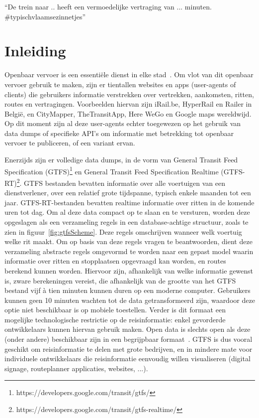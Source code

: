 \begin{savequote}[0.55\linewidth]
	``De trein naar .. heeft een vermoedelijke vertraging van ... minuten. \#typischvlaamsezinnetjes''
\end{savequote}

\chapter{Inleiding}
\label{chap:intro}
Openbaar vervoer is een essentiële dienst in elke stad~\citep{programmableweb14}. Om vlot van dit openbaar vervoer gebruik te maken, zijn er tientallen websites en apps (user-agents of clients) die gebruikers informatie verstrekken over vertrekken, aankomsten, ritten, routes en vertragingen. Voorbeelden hiervan zijn iRail.be, HyperRail en Railer in België, en CityMapper, TheTransitApp, Here WeGo en Google maps wereldwijd. Op dit moment zijn al deze user-agents echter toegewezen op het gebruik van data dumps of specifieke API's om informatie met betrekking tot openbaar vervoer te publiceren, of een variant ervan. 

Enerzijds zijn er volledige data dumps, in de vorm van General Transit Feed Specification (GTFS)\footnote{https://developers.google.com/transit/gtfs/} en General Transit Feed Specification Realtime (GTFS-RT)\footnote{https://developers.google.com/transit/gtfs-realtime/}. GTFS bestanden bevatten informatie over alle voertuigen van een dienstverlener, over een relatief grote tijdspanne, typisch enkele maanden tot een jaar. GTFS-RT-bestanden bevatten realtime informatie over ritten in de komende uren tot dag. Om al deze data compact op te slaan en te versturen, worden deze opgeslagen als een verzameling regels in een database-achtige structuur, zoals te zien in figuur~\ref{fig:gtfsScheme}. Deze regels omschrijven wanneer welk voertuig welke rit maakt. Om op basis van deze regels vragen te beantwoorden, dient deze verzameling abstracte regels omgevormd te worden naar een gepast model waarin informatie over ritten en stopplaatsen opgevraagd kan worden, en routes berekend kunnen worden. Hiervoor zijn, afhankelijk van welke informatie gewenst is, zware berekeningen vereist, die afhankelijk van de grootte van het GTFS bestand vijf à tien minuten kunnen duren op een moderne computer. Gebruikers kunnen geen 10 minuten wachten tot de data getransformeerd zijn, waardoor deze optie niet beschikbaar is op mobiele toestellen. Verder is dit formaat een mogelijke technologische restrictie op de reisinformatie: enkel gevorderde ontwikkelaars kunnen hiervan gebruik maken. Open data is slechts open als deze (onder andere) beschikbaar zijn in een begrijpbaar formaat~\citep{okfn18}. GTFS is dus vooral geschikt om reisinformatie te delen met grote bedrijven, en in mindere mate voor individuele ontwikkelaars die reisinformatie eenvoudig willen visualiseren (digital signage, routeplanner applicaties, websites, ...).

